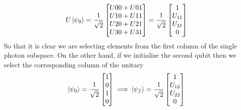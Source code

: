 \documentclass{article}
\begin{document}
    \begin{equation}
        U\ket{\psi_0} =
        \frac{1}{\sqrt{2}}
        \begin{bmatrix}
            U00 + U01 \\
            U10 + U11 \\
            U20 + U21 \\
            U30 + U31 \\
        \end{bmatrix}
        =
        \frac{1}{\sqrt{2}}
        \begin{bmatrix}
            1 \\
            U_{11} \\
            U_{21} \\
            0 \\
        \end{bmatrix}
    \end{equation}
    So that it is clear we are selecting elements from the first column of the single photon subspace.
    On the other hand, if we initialize the second qubit then we select the corresponding column of the unitary
    \begin{equation}
        \ket{\psi_0}=\frac{1}{\sqrt{2}}
        \begin{bmatrix}
            1 \\
            0 \\
            1 \\
            0 \\
        \end{bmatrix}
        \implies
        \ket{\psi_{f}}=
        \frac{1}{\sqrt{2}}
        \begin{bmatrix}
            1 \\
            U_{12} \\
            U_{22} \\
            0 \\
        \end{bmatrix}
    \end{equation}
\end{document}
